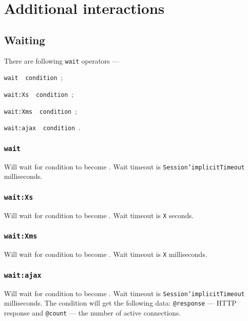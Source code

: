\section{Additional interactions}

\subsection{Waiting}

There are following \texttt{wait} operators —
\begin{icItems}
	\item \texttt{wait { condition }};
	\item \texttt{wait:Xs { condition }};
	\item \texttt{wait:Xms { condition }};
	\item \texttt{wait:ajax { condition }}.
\end{icItems}

\subsubsection{\texttt{wait}}

Will wait for condition to become \true. Wait timeout is \texttt{Session'implicitTimeout} milliseconds. 

\subsubsection{\texttt{wait:Xs}}

Will wait for condition to become \true. Wait timeout is \texttt{X} seconds. 

\subsubsection{\texttt{wait:Xms}}

Will wait for condition to become \true. Wait timeout is \texttt{X} milliseconds.

\subsubsection{\texttt{wait:ajax}}

Will wait for condition to become \true. Wait timeout is \texttt{Session'implicitTimeout} milliseconds. The condition will get the following data: \texttt{@response} — HTTP response and \texttt{@count} — the number of active connections.

